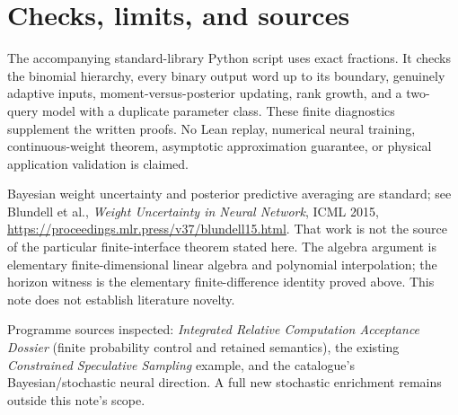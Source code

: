 \documentclass[11pt]{article}
\begin{document}
\section{Checks, limits, and sources}
The accompanying standard-library Python script uses exact fractions. It checks the binomial hierarchy, every binary output word up to its boundary, genuinely adaptive inputs, moment-versus-posterior updating, rank growth, and a two-query model with a duplicate parameter class. These finite diagnostics supplement the written proofs. No Lean replay, numerical neural training, continuous-weight theorem, asymptotic approximation guarantee, or physical application validation is claimed.

Bayesian weight uncertainty and posterior predictive averaging are standard; see Blundell et al., \emph{Weight Uncertainty in Neural Network}, ICML 2015, \url{https://proceedings.mlr.press/v37/blundell15.html}. That work is not the source of the particular finite-interface theorem stated here. The algebra argument is elementary finite-dimensional linear algebra and polynomial interpolation; the horizon witness is the elementary finite-difference identity proved above. This note does not establish literature novelty.

Programme sources inspected: \emph{Integrated Relative Computation Acceptance Dossier} (finite probability control and retained semantics), the existing \emph{Constrained Speculative Sampling} example, and the catalogue's Bayesian/stochastic neural direction. A full new stochastic enrichment remains outside this note's scope.
\end{document}
